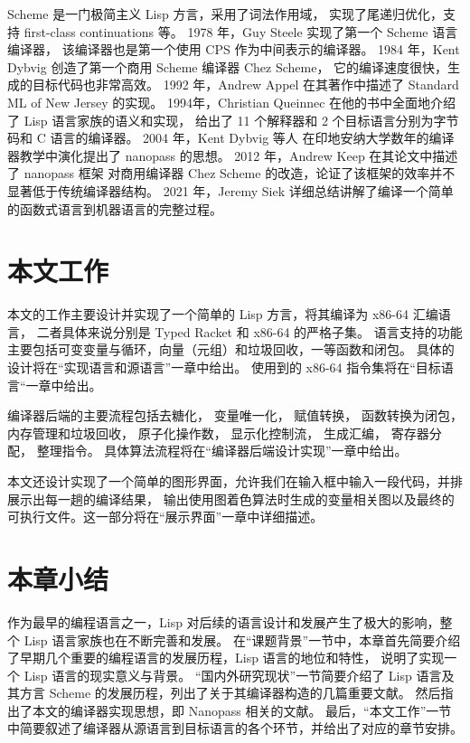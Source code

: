 Scheme 是一门极简主义 Lisp 方言，采用了词法作用域，
实现了尾递归优化，支持 first-class continuations 等。
1978 年，Guy Steele\cite{Steele_1978} 实现了第一个 Scheme 语言编译器，
该编译器也是第一个使用 CPS 作为中间表示的编译器。
1984 年，Kent Dybvig 创造了第一个商用 Scheme 编译器 Chez Scheme\cite{Dybvig_2006}，
它的编译速度很快，生成的目标代码也非常高效。
1992 年，Andrew Appel\cite{Appel_1992} 在其著作中描述了 Standard ML of New Jersey 的实现。
1994年，Christian Queinnec\cite{Queinnec_1996} 在他的书中全面地介绍了 Lisp 语言家族的语义和实现，
给出了 11 个解释器和 2 个目标语言分别为字节码和 C 语言的编译器。
2004 年，Kent Dybvig 等人\cite{Sarkar_Waddell_Dybvig_2004}
在印地安纳大学数年的编译器教学中演化提出了 nanopass 的思想。
2012 年，Andrew Keep\cite{Keep_Dybvig_2013} 在其论文中描述了 nanopass 框架
对商用编译器 Chez Scheme 的改造，论证了该框架的效率并不显著低于传统编译器结构。
2021 年，Jeremy Siek\cite{Siek_2022} 详细总结讲解了编译一个简单的函数式语言到机器语言的完整过程。

\section{本文工作}

本文的工作主要设计并实现了一个简单的 Lisp 方言，将其编译为 x86-64 汇编语言，
二者具体来说分别是 Typed Racket 和 x86-64 的严格子集。
语言支持的功能主要包括可变变量与循环，向量（元组）和垃圾回收，一等函数和闭包。
具体的设计将在“实现语言和源语言”一章中给出。
使用到的 x86-64 指令集将在“目标语言“一章中给出。

编译器后端的主要流程包括去糖化，
变量唯一化，
赋值转换，
函数转换为闭包，
内存管理和垃圾回收，
原子化操作数，
显示化控制流，
生成汇编，
寄存器分配，
整理指令。
具体算法流程将在“编译器后端设计实现”一章中给出。

本文还设计实现了一个简单的图形界面，允许我们在输入框中输入一段代码，并排展示出每一趟的编译结果，
输出使用图着色算法时生成的变量相关图以及最终的可执行文件。这一部分将在“展示界面”一章中详细描述。

\section{本章小结}

作为最早的编程语言之一，Lisp 对后续的语言设计和发展产生了极大的影响，整个 Lisp 语言家族也在不断完善和发展。
在“课题背景”一节中，本章首先简要介绍了早期几个重要的编程语言的发展历程，Lisp 语言的地位和特性，
说明了实现一个 Lisp 语言的现实意义与背景。
“国内外研究现状”一节简要介绍了 Lisp 语言及其方言 Scheme 的发展历程，列出了关于其编译器构造的几篇重要文献。
然后指出了本文的编译器实现思想，即 Nanopass 相关的文献。
最后，“本文工作”一节中简要叙述了编译器从源语言到目标语言的各个环节，并给出了对应的章节安排。
